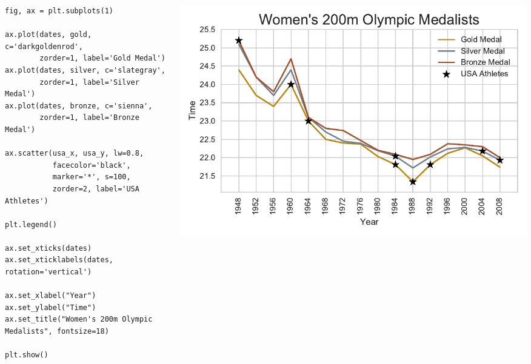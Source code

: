 \documentclass{beamer}
\begin{document}
\begin{frame}[fragile]
\tiny{
\begin{columns}
\begin{column}{0.45\textwidth}
\begin{verbatim}
fig, ax = plt.subplots(1)

ax.plot(dates, gold, c='darkgoldenrod',
        zorder=1, label='Gold Medal')
ax.plot(dates, silver, c='slategray',
        zorder=1, label='Silver Medal')
ax.plot(dates, bronze, c='sienna',
        zorder=1, label='Bronze Medal')

ax.scatter(usa_x, usa_y, lw=0.8,
           facecolor='black',
           marker='*', s=100,
           zorder=2, label='USA Athletes')

plt.legend()

ax.set_xticks(dates)
ax.set_xticklabels(dates, rotation='vertical')

ax.set_xlabel("Year")
ax.set_ylabel("Time")
ax.set_title("Women's 200m Olympic Medalists", fontsize=18)

plt.show()
\end{verbatim}
\end{column}
\begin{column}{0.55\textwidth}
\includegraphics[width=\textwidth]{../olympics_8.pdf}
\end{column}
\end{columns}
}
\end{frame}
\end{document}

